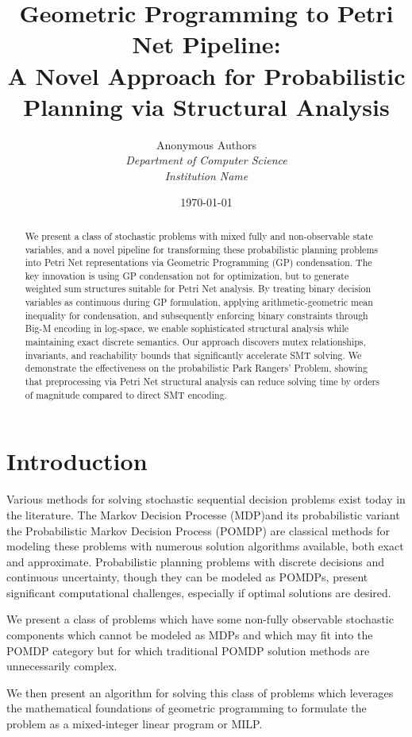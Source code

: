 \documentclass[11pt]{article}
\title{Geometric Programming to Petri Net Pipeline:\\
A Novel Approach for Probabilistic Planning via Structural Analysis}
\author{
Anonymous Authors\\
\textit{Department of Computer Science}\\
\textit{Institution Name}
}
\date{\today}
\begin{document}
\maketitle

\begin{abstract}
  We present a class of stochastic problems with mixed fully and
  non-observable state variables, and a novel pipeline for
  transforming these probabilistic planning problems into Petri Net
  representations via Geometric Programming (GP) condensation. The key
  innovation is using GP condensation not for optimization, but to
  generate weighted sum structures suitable for Petri Net analysis. By
  treating binary decision variables as continuous during GP
  formulation, applying arithmetic-geometric mean inequality for
  condensation, and subsequently enforcing binary constraints through
  Big-M encoding in log-space, we enable sophisticated structural
  analysis while maintaining exact discrete semantics. Our approach
  discovers mutex relationships, invariants, and reachability bounds
  that significantly accelerate SMT solving. We demonstrate the
  effectiveness on the probabilistic Park Rangers' Problem, showing
  that preprocessing via Petri Net structural analysis can reduce
  solving time by orders of magnitude compared to direct SMT encoding.
\end{abstract}

\section{Introduction}

Various methods for solving stochastic sequential decision problems
exist today in the literature. The Markov Decision Processe (MDP)and
its probabilistic variant the Probabilistic Markov Decision Process
(POMDP) are classical methods for modeling these problems with
numerous solution algorithms available, both exact and
approximate. Probabilistic planning problems with discrete decisions
and continuous uncertainty, though they can be modeled as POMDPs,
present significant computational challenges, especially if optimal
solutions are desired.

We present a class of problems which have some non-fully observable
stochastic components which cannot be modeled as MDPs and which may
fit into the POMDP category but for which traditional POMDP solution
methods are unnecessarily complex.

We then present an algorithm for solving this class of problems which
leverages the mathematical foundations of geometric programming to
formulate the problem as a mixed-integer linear program or MILP.
\end{document}
